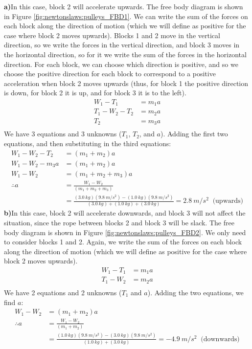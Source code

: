 \begin{solution}
\textbf{a)}In this case, block 2 will accelerate upwards. The free body diagram is shown in Figure \ref{fig:newtonslaws:pulleys_FBD1}.
We can write the sum of the forces on each block along the direction of motion (which we will define as positive for the case where block 2 moves upwards). Blocks 1 and 2 move in the vertical direction, so we write the forces in the vertical direction, and block 3 moves in the horizontal direction, so for it we write the sum of the forces in the horizontal direction. For each block, we can choose which direction is positive, and so we choose the positive direction for each block to correspond to a positive acceleration when block 2 moves upwards (thus, for block 1 the positive direction is down, for block 2 it is up, and for block 3 it is to the left).
\begin{align*}
W_1-T_1 &= m_1a \\
T_1-W_2-T_2 &= m_2a \\
T_2 &= m_3a \\
\end{align*}
We have 3 equations and 3 unknowns ($T_1$, $T_2$, and $a$). Adding the first two equations, and then substituting in the third equations:
\begin{align*}
W_1-W_2-T_2 &= (m_1+m_2)a\\
W_1-W_2-m_3a &= (m_1+m_2)a\\
W_1-W_2&= (m_1+m_2+m_3)a\\
\therefore a&=\frac{W_1-W_2}{(m_1+m_2+m_3)}\\
  &=\frac{(\SI{3.0}{kg})(\SI{9.8}{m/s^2})-(\SI{1.0}{kg})(\SI{9.8}{m/s^2})}{(\SI{3.0}{kg})+(\SI{1.0}{kg})+(\SI{3.0}{kg})}=\SI{2.8}{m/s^2}\;\;\text{(upwards)}
\end{align*}
\textbf{b)}In this case, block 2 will accelerate downwards, and block 3 will not affect the situation, since the rope between blocks 2 and block 3 will be slack. The free body diagram is shown in Figure \ref{fig:newtonslaws:pulleys_FBD2}.
We only need to consider blocks 1 and 2. Again, we write the sum of the forces on each block along the direction of motion (which we will define as positive for the case where block 2 moves upwards).
\begin{align*}
W_1-T_1 &= m_1a \\
T_1-W_2&= m_2a \\
\end{align*}
We have 2 equations and 2 unknowns ($T_1$ and $a$). Adding the two equations, we find $a$:
\begin{align*}
W_1-W_2 &= (m_1+m_2)a\\
\therefore a&=\frac{W_1-W_2}{(m_1+m_2)}\\
&=\frac{(\SI{1.0}{kg})(\SI{9.8}{m/s^2})-(\SI{3.0}{kg})(\SI{9.8}{m/s^2})}{(\SI{1.0}{kg})+(\SI{3.0}{kg})}=-\SI{4.9}{m/s^2}\;\;\text{(downwards)}
\end{align*}


\end{solution}
